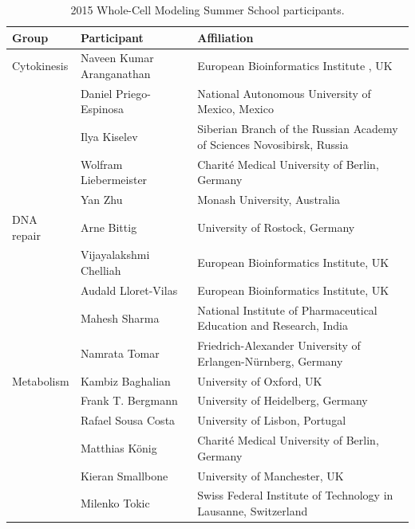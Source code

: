 \documentclass[journal,transmag]{IEEEtran}
\begin{document}
\begin{table}[ht!]
\caption{2015 Whole-Cell Modeling Summer School participants.}
\begin{tabularx}{\textwidth}{llX}
\toprule
\textbf{Group}           & \textbf{Participant}            & \textbf{Affiliation}\\
\midrule
Cytokinesis               & Naveen Kumar Aranganathan        & European Bioinformatics Institute , UK\\
                          & Daniel Priego-Espinosa           & National Autonomous University of Mexico, Mexico\\
                          & Ilya Kiselev                     & Siberian Branch of the Russian Academy of Sciences Novosibirsk, Russia\\
                          & Wolfram Liebermeister            & Charit\'e Medical University of Berlin, Germany\\
                          & Yan Zhu                          & Monash University, Australia\\
\midrule
DNA repair                & Arne Bittig                      & University of Rostock, Germany\\
                          & Vijayalakshmi Chelliah           & European Bioinformatics Institute, UK\\
                          & Audald Lloret-Vilas              & European Bioinformatics Institute, UK\\
                          & Mahesh Sharma                    & National Institute of Pharmaceutical Education and Research, India\\
                          & Namrata Tomar                    & Friedrich-Alexander University of Erlangen-N\"urnberg, Germany\\
\midrule
Metabolism                & Kambiz Baghalian                 & University of Oxford, UK\\
                          & Frank T. Bergmann                & University of Heidelberg, Germany\\
                          & Rafael Sousa Costa               & University of Lisbon, Portugal\\
                          & Matthias K\"onig                 & Charit\'e Medical University of Berlin, Germany\\
                          & Kieran Smallbone                 & University of Manchester, UK\\
                          & Milenko Tokic                    & Swiss Federal Institute of Technology in Lausanne, Switzerland\\

\end{tabularx}
\end{table}
\end{document}
